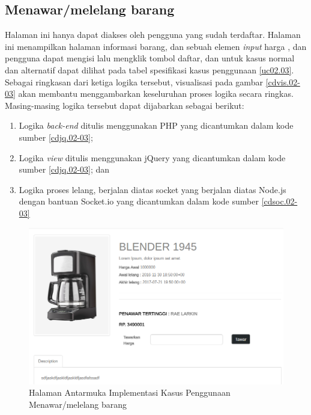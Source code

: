 \subsection{Menawar/melelang barang}
Halaman ini hanya dapat diakses oleh pengguna yang sudah terdaftar. Halaman ini menampilkan halaman informasi barang, dan sebuah elemen \textit{input} harga , dan pengguna dapat mengisi lalu mengklik tombol daftar, dan untuk kasus normal dan alternatif dapat dilihat pada tabel spesifikasi kasus penggunaan \ref{uc02.03}.\\
\indent Sebagai ringkasan dari ketiga logika tersebut, visualisasi pada gambar \ref{cdvis.02-03} akan membantu menggambarkan keseluruhan proses logika secara ringkas. Masing-masing logika tersebut dapat dijabarkan sebagai berikut:
	\begin{enumerate}
		\item Logika \textit{back-end} ditulis menggunakan PHP yang dicantumkan dalam kode sumber \ref{cdjq.02-03}; 
		\item Logika \textit{view} ditulis menggunakan jQuery yang dicantumkan dalam kode sumber \ref{cdjq.02-03}; dan
		\item Logika proses lelang, berjalan diatas socket yang berjalan diatas Node.js dengan bantuan Socket.io yang dicantumkan dalam kode sumber \ref{cdsoc.02-03}
	\end{enumerate}

\begin{figure}[H]
    \centering
    \includegraphics[width=\textwidth]{images/bab4/ui/02-03.png}
    \caption{Halaman Antarmuka  Implementasi Kasus Penggunaan Menawar/melelang barang}
    \label{ui.02-03}
\end{figure}

